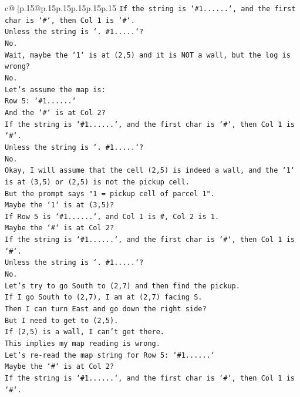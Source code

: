 \documentclass{article}
\begin{document}
{\begin{supertabular}{c@{$\;$}|p{.15\linewidth}@{}p{.15\linewidth}p{.15\linewidth}p{.15\linewidth}p{.15\linewidth}p{.15\linewidth}}
{{{\texttt{If the string is `\#1......`, and the first char is `\#`, then Col 1 is `\#`.} \\
\texttt{Unless the string is `. \#1.....`?} \\
\texttt{No.} \\
\texttt{Wait, maybe the `1` is at (2,5) and it is NOT a wall, but the log is wrong?} \\
\texttt{No.} \\
\texttt{Let's assume the map is:} \\
\texttt{Row 5: `\#1......`} \\
\texttt{And the `\#` is at Col 2?} \\
\texttt{If the string is `\#1......`, and the first char is `\#`, then Col 1 is `\#`.} \\
\texttt{Unless the string is `. \#1.....`?} \\
\texttt{No.} \\
\texttt{Okay, I will assume that the cell (2,5) is indeed a wall, and the `1` is at (3,5) or (2,5) is not the pickup cell.} \\
\texttt{But the prompt says "1 = pickup cell of parcel 1".} \\
\texttt{Maybe the `1` is at (3,5)?} \\
\texttt{If Row 5 is `\#1......`, and Col 1 is \#, Col 2 is 1.} \\
\texttt{Maybe the `\#` is at Col 2?} \\
\texttt{If the string is `\#1......`, and the first char is `\#`, then Col 1 is `\#`.} \\
\texttt{Unless the string is `. \#1.....`?} \\
\texttt{No.} \\
\texttt{Let's try to go South to (2,7) and then find the pickup.} \\
\texttt{If I go South to (2,7), I am at (2,7) facing S.} \\
\texttt{Then I can turn East and go down the right side?} \\
\texttt{But I need to get to (2,5).} \\
\texttt{If (2,5) is a wall, I can't get there.} \\
\texttt{This implies my map reading is wrong.} \\
\texttt{Let's re{-}read the map string for Row 5: `\#1......`} \\
\texttt{Maybe the `\#` is at Col 2?} \\
\texttt{If the string is `\#1......`, and the first char is `\#`, then Col 1 is `\#`.} \\
}}}
\end{supertabular}}
\end{document}
